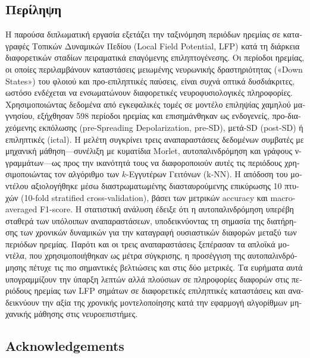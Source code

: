 \documentclass{article}
\begin{document}
\begin{greek}
\begin{center}
	\section*{Περίληψη}
\end{center}
	\noindent
	Η παρούσα διπλωματική εργασία εξετάζει την ταξινόμηση περιόδων ηρεμίας σε καταγραφές Τοπικών Δυναμικών Πεδίου (Local Field Potential, LFP) κατά τη διάρκεια διαφορετικών σταδίων πειραματικά επαγόμενης επιληπτογένεσης. Οι περίοδοι ηρεμίας, οι οποίες περιλαμβάνουν καταστάσεις μειωμένης νευρωνικής δραστηριότητας («Down States») του φλοιού και προ-επιληπτικές παύσεις, είναι συχνά οπτικά δυσδιάκριτες, ωστόσο ενδέχεται να ενσωματώνουν διαφορετικές νευροφυσιολογικές πληροφορίες. Χρησιμοποιώντας δεδομένα από εγκεφαλικές τομές σε μοντέλο επιληψίας χαμηλού μαγνησίου, εξήχθησαν 598 περίοδοι ηρεμίας και επισημάνθηκαν ως ενδογενείς, προ-διαχεόμενης εκπόλωσης (pre-Spreading Depolarization, pre-SD), μετά-SD (post-SD) ή επιληπτικές (ictal). Η μελέτη συγκρίνει τρεις αναπαραστάσεις δεδομένων συμβατές με μηχανική μάθηση—συνέλιξη με κυματίδια Morlet, αυτοπαλινδρόμηση και γράφους ν-γραμμάτων—ως προς την ικανότητά τους να διαφοροποιούν αυτές τις περιόδους χρησιμοποιώντας τον αλγόριθμο των $k$-Εγγυτέρων Γειτόνων (k-NN). Η απόδοση του μοντέλου αξιολογήθηκε μέσω διαστρωματωμένης διασταυρούμενης επικύρωσης 10 πτυχών (10-fold stratified cross-validation), βάσει των μετρικών accuracy και macro-averaged F1-score. Η στατιστική ανάλυση έδειξε ότι η αυτοπαλινδρόμηση υπερέβη σταθερά των υπόλοιπων αναπαραστάσεων, υποδεικνύοντας τη σημασία της διατήρησης των χρονικών δυναμικών για την καταγραφή ουσιαστικών διαφορών μεταξύ των περιόδων ηρεμίας. Παρότι και οι τρεις αναπαραστάσεις ξεπέρασαν τα απλοϊκά μοντέλα, που χρησιμοποιήθηκαν ως μέτρα σύγκρισης, η προσέγγιση της αυτοπαλινδρόμησης πέτυχε τις πιο σημαντικές βελτιώσεις και στις δύο μετρικές. Τα ευρήματα αυτά υπογραμμίζουν την ύπαρξη λεπτών αλλά πλούσιων σε πληροφορίες διαφορών στις περιόδους ηρεμίας των LFP σημάτων σε διαφορετικές επιληπτικές καταστάσεις και αναδεικνύουν την αξία της χρονικής μοντελοποίησης κατά την εφαρμογή αλγορίθμων μηχανικής μάθησης στις νευροεπιστήμες.
\end{greek}
\newpage

\begin{center}
	\section*{Acknowledgements}
\end{center}
\end{document}

